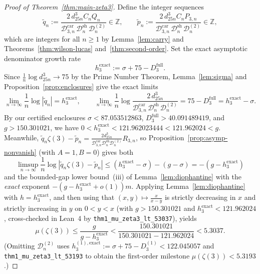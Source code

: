 \documentclass[11pt,reqno]{amsart}
\theoremstyle{definition}
\theoremstyle{remark}
\newcommand{\ZZ}{\mathbb{Z}}
\begin{document}
\begin{proof}[Proof of Theorem~\ref{thm:main-zeta3}]
Define the integer sequences
\[
  \widetilde{q}_n := \frac{2\, d_{25n}^3 C_n Q_n}{\mathcal{D}_{3,n}^{\mathrm{car}}\,\mathcal{D}_n^{\mathrm{sh}}\,\mathcal{D}_n^{(2)}} \in \ZZ,
  \qquad
  \widetilde{p}_n := \frac{2\, d_{25n}^3 C_n P_{3,n}}{\mathcal{D}_{3,n}^{\mathrm{car}}\,\mathcal{D}_n^{\mathrm{sh}}\,\mathcal{D}_n^{(2)}} \in \ZZ,
\]
which are integers for all $n \ge 1$ by Lemma~\ref{lem:carry} and Theorems~\ref{thm:wilson-lucas} and~\ref{thm:second-order}. Set the exact asymptotic denominator growth rate
\[
  h_3^{\mathrm{exact}} := \sigma + 75 - D_3^{\mathrm{full}}.
\]
Since $\frac{1}{n}\log d_{25n}^3 \to 75$ by the Prime Number Theorem, Lemma~\ref{lem:sigma} and Proposition~\ref{prop:enclosures} give the exact limits
\[
  \lim_{n\to\infty} \frac{1}{n}\log|\widetilde{q}_n| = h_3^{\mathrm{exact}},
  \qquad
  \lim_{n\to\infty} \frac{1}{n}\log\frac{2\,d_{25n}^3}{\mathcal{D}_{3,n}^{\mathrm{car}}\,\mathcal{D}_n^{\mathrm{sh}}\,\mathcal{D}_n^{(2)}} = 75 - D_3^{\mathrm{full}} = h_3^{\mathrm{exact}} - \sigma.
\]
By our certified enclosures $\sigma < 87.053512863$, $D_3^{\mathrm{full}} > 40.091489419$, and $g > 150.301021$, we have $0 < h_3^{\mathrm{exact}} < 121.962023444 < 121.962024 < g$. Meanwhile, $\widetilde{q}_n \zeta(3) - \widetilde{p}_n = \frac{2 d_{25n}^3}{\mathcal{D}_{3,n}^{\mathrm{car}}\mathcal{D}_n^{\mathrm{sh}}\mathcal{D}_n^{(2)}} R_{3,n}$, so Proposition~\ref{prop:asymp-nonvanish} (with $A = 1, B = 0$) gives both
\[
  \limsup_{n\to\infty} \frac{1}{n}\log|\widetilde{q}_n\zeta(3) - \widetilde{p}_n|
  \le (h_3^{\mathrm{exact}} - \sigma) - (g - \sigma)
  = -(g - h_3^{\mathrm{exact}})
\]
and the bounded-gap lower bound~(iii) of Lemma~\ref{lem:diophantine} with the \emph{exact} exponent $-(g - h_3^{\mathrm{exact}} + o(1))m$. Applying Lemma~\ref{lem:diophantine} with $h = h_3^{\mathrm{exact}}$, and then using that $(x, y) \mapsto \frac{x}{x - y}$ is strictly decreasing in $x$ and strictly increasing in $y$ on $0 < y < x$ (with $g > 150.301021$ and $h_3^{\mathrm{exact}} < 121.962024$, cross-checked in Lean~4 by \texttt{thm1\_mu\_zeta3\_lt\_53037}), yields
\[
  \mu(\zeta(3)) \le \frac{g}{g - h_3^{\mathrm{exact}}} < \frac{150.301021}{150.301021 - 121.962024} < 5.3037.
\]
(Omitting $\mathcal{D}_n^{(2)}$ uses $h_3^{(1),\mathrm{exact}} := \sigma + 75 - D_3^{(1)} < 122.045057$ and \texttt{thm1\_mu\_zeta3\_lt\_53193} to obtain the first-order milestone $\mu(\zeta(3)) < 5.3193$.)
\end{proof}
\end{document}
